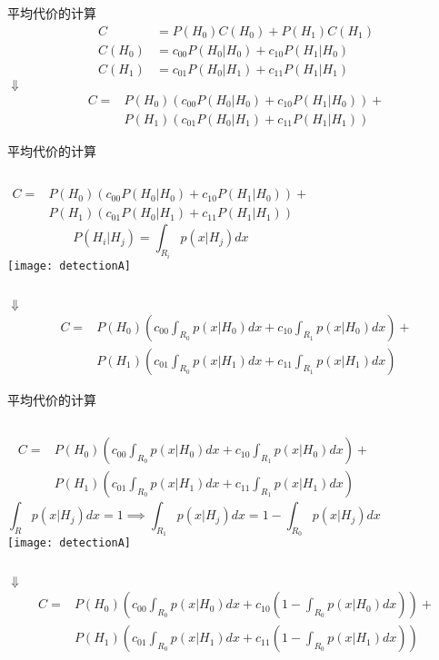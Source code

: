 \begin{frame}{平均代价的计算}
\begin{align*}
C&=P(H_0)C(H_0)+P(H_1)C(H_1)\\
C(H_0)&=c_{00}P(H_0|H_0)+c_{10}P(H_1|H_0)\\
C(H_1)&=c_{01}P(H_0|H_1)+c_{11}P(H_1|H_1)
\end{align*}
\centering $\Downarrow$
\begin{align*}
C=&P(H_0)(c_{00}P(H_0|H_0)+c_{10}P(H_1|H_0))+\\
&P(H_1)(c_{01}P(H_0|H_1)+c_{11}P(H_1|H_1))
\end{align*}
\end{frame}

\begin{frame}[shrink]{平均代价的计算}
\begin{columns}
	\begin{align*}
	C=&P(H_0)(c_{00}P(H_0|H_0)+c_{10}P(H_1|H_0))+\\
	&P(H_1)(c_{01}P(H_0|H_1)+c_{11}P(H_1|H_1))
	\end{align*}
	\[ P(H_i|H_j)=\int_{R_i}p(x|H_j)dx\]
	\texttt{[image: detectionA]}
\end{columns}

\medskip
\centering $\Downarrow$
\begin{align*}
C=&P(H_0)\left(c_{00}\int_{R_0}p(x|H_0)dx+c_{10}\int_{R_1}p(x|H_0)dx\right)+\\
&P(H_1)\left(c_{01}\int_{R_0}p(x|H_1)dx+c_{11}\int_{R_1}p(x|H_1)dx\right)
\end{align*}

\end{frame}

\begin{frame}[shrink]{平均代价的计算}
\begin{columns}
	\begin{align*}
	C=&P(H_0)\left(c_{00}\int_{R_0}p(x|H_0)dx+c_{10}\int_{R_1}p(x|H_0)dx\right)+\\
	&P(H_1)\left(c_{01}\int_{R_0}p(x|H_1)dx+c_{11}\int_{R_1}p(x|H_1)dx\right)
	\end{align*}
	\[\int_{R}p(x|H_j)dx=1 \implies \int_{R_1}p(x|H_j)dx=1-\int_{R_0}p(x|H_j)dx \]
	\texttt{[image: detectionA]}
\end{columns}

\medskip
\centering $\Downarrow$
\begin{align*}
C=&P(H_0)\left(c_{00}\int_{R_0}p(x|H_0)dx+c_{10}\left(1-\int_{R_0}p(x|H_0)dx\right)\right)+\\
&P(H_1)\left(c_{01}\int_{R_0}p(x|H_1)dx+c_{11}\left(1-\int_{R_0}p(x|H_1)dx\right)\right)
\end{align*}
\end{frame}

